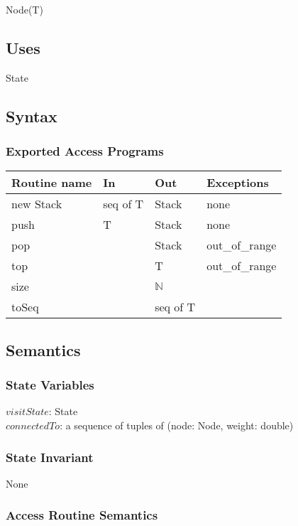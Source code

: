 \documentclass[12pt]{article}
\begin{document}
Node(T)

\subsection* {Uses}

\noindent State\\

\subsection* {Syntax}

\subsubsection* {Exported Access Programs}

\begin{tabular}{| l | l | l | p{5cm} |}
\hline
\textbf{Routine name} & \textbf{In} & \textbf{Out} & \textbf{Exceptions}\\
\hline
new Stack & seq of T & Stack & none\\
\hline
push & T & Stack & none\\
\hline
pop & & Stack & out\_of\_range\\
\hline
top & & T & out\_of\_range\\
\hline
size & & $\mathbb{N}$ & \\
\hline
toSeq& & seq of T & \\
\hline
\end{tabular}

\subsection* {Semantics}

\subsubsection* {State Variables}

$visitState$: State\\
$connectedTo$:  a sequence of tuples of (node: Node, weight: double)

\subsubsection* {State Invariant}

None

\subsubsection* {Access Routine Semantics}
\end{document}
